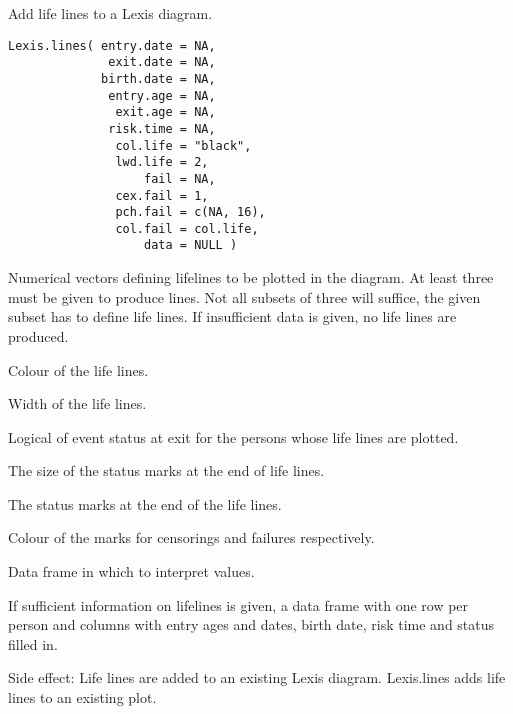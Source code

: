 \begin{Description}\relax
Add life lines to a Lexis diagram.
\end{Description}
\begin{Usage}
\begin{verbatim}
Lexis.lines( entry.date = NA,
              exit.date = NA,
             birth.date = NA,
              entry.age = NA,
               exit.age = NA,
              risk.time = NA,
               col.life = "black",
               lwd.life = 2,
                   fail = NA,
               cex.fail = 1,
               pch.fail = c(NA, 16),
               col.fail = col.life,
                   data = NULL )
\end{verbatim}
\end{Usage}
\begin{Arguments}
\begin{ldescription}
\item[\code{entry.date, entry.age, exit.date, exit.age, risk.time,
birth.date}] Numerical vectors defining lifelines to be plotted
in the diagram. At least three must be given to produce lines.
Not all subsets of three will suffice, the given subset has to 
define life lines. If insufficient data is given, no life
lines are produced.
\item[\code{col.life}] Colour of the life lines.
\item[\code{lwd.life}] Width of the life lines.
\item[\code{fail}] Logical of event status at exit for the persons whose 
life lines are plotted.
\item[\code{cex.fail}] The size of the status marks at the end of life lines.
\item[\code{pch.fail}] The status marks at the end of the life lines.
\item[\code{col.fail}] Colour of the marks for censorings and failures
respectively.
\item[\code{data}] Data frame in which to interpret values.
\end{ldescription}
\end{Arguments}
\begin{Value}
If sufficient information on lifelines is given, a data frame with one
row per person and columns with entry ages and dates, birth date, risk
time and status filled in.

Side effect: Life lines are added to an existing Lexis
diagram. Lexis.lines adds life lines to an existing plot.
\end{Value}
